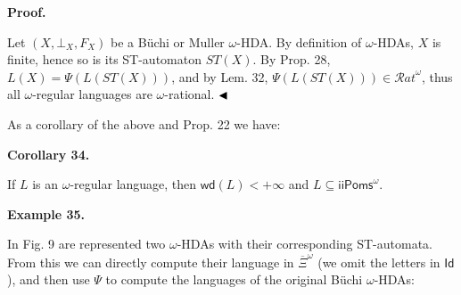  
 
 
\par\medskip\noindent\textbf{Proof.}\par
 
 
Let $(X,\bot_{X},F_{X})$ be a Büchi or Muller $\omega$-HDA. By definition of $\omega$-HDAs, $X$ is finite, hence so is its ST-automaton $ST(X)$. By Prop. 28, $L(X)=\Psi(L(ST(X)))$, and by Lem. 32, $\Psi(L(ST(X)))\in{\mathcal{R}at}^{\omega}$, thus all $\omega$-regular languages are $\omega$-rational. $\hfill\blacktriangleleft$\par
 
 
 
As a corollary of the above and Prop. 22 we have:\par
 
 
 
\par\medskip\noindent\textbf{Corollary 34.}\par
 
 
If $L$ is an $\omega$-regular language, then $\mathsf{wd}(L)<+\infty$ and $L\subseteq{\mathsf{iiPoms}^{\omega}}$.\par
 
 
 
 
\par\medskip\noindent\textbf{Example 35.}\par
 
 
In Fig. 9 are represented two $\omega$-HDAs with their corresponding ST-automata. From this we can directly compute their language in $\overline{\Xi}^{\omega}$ (we omit the letters in $\mathsf{Id}$), and then use $\Psi$ to compute the languages of the original Büchi $\omega$-HDAs:\par
 
 
 
